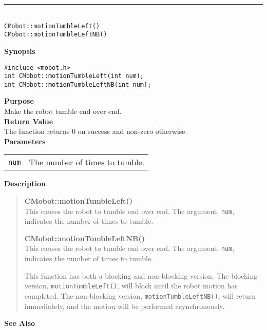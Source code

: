 \noindent
\vspace{5pt}
\rule{4.5in}{0.015in}\\
\noindent
{\LARGE \texttt{CMobot::motionTumbleLeft()}}\\
{\LARGE \texttt{CMobot::motionTumbleLeftNB()}}\\
{}

\noindent
{\bf Synopsis}
\vspace{-8pt}
\begin{verbatim}
#include <mobot.h>
int CMobot::motionTumbleLeft(int num);
int CMobot::motionTumbleLeftNB(int num);
\end{verbatim}

\noindent
{\bf Purpose}\\
Make the robot tumble end over end.\\

\noindent
{\bf Return Value}\\
The function returns 0 on success and non-zero otherwise.\\

\noindent
{\bf Parameters}\\
\vspace{-0.1in}
\begin{description}
\item               
\begin{tabular}{p{10 mm}p{145 mm}}
\texttt{num} & The number of times to tumble. \\
\end{tabular}
\end{description}

\noindent
{\bf Description}\\
\vspace{-12pt}
\begin{quote}
{\bf CMobot::motionTumbleLeft()}\\
This causes the robot to tumble end over end. The argument, \texttt{num},
indicates the number of times to tumble.

{\bf CMobot::motionTumbleLeftNB()}\\
This causes the robot to tumble end over end. The argument, \texttt{num},
indicates the number of times to tumble.

This function has both a blocking and non-blocking version.
The blocking version, \texttt{motionTumbleLeft()}, will block until the
robot motion has completed. The non-blocking version, \texttt{motionTumbleLeftNB()},
will return immediately, and the motion will be performed asynchronously.\\
\end{quote}

\noindent
{\bf See Also}\\

